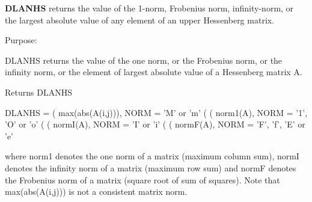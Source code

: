 {\bfseries D\+L\+A\+N\+H\+S} returns the value of the 1-\/norm, Frobenius norm, infinity-\/norm, or the largest absolute value of any element of an upper Hessenberg matrix. 

 \begin{DoxyParagraph}{Purpose\+: }
\begin{DoxyVerb} DLANHS  returns the value of the one norm,  or the Frobenius norm, or
 the  infinity norm,  or the  element of  largest absolute value  of a
 Hessenberg matrix A.\end{DoxyVerb}

\end{DoxyParagraph}
\begin{DoxyReturn}{Returns}
D\+L\+A\+N\+H\+S \begin{DoxyVerb}    DLANHS = ( max(abs(A(i,j))), NORM = 'M' or 'm'
             (
             ( norm1(A),         NORM = '1', 'O' or 'o'
             (
             ( normI(A),         NORM = 'I' or 'i'
             (
             ( normF(A),         NORM = 'F', 'f', 'E' or 'e'

 where  norm1  denotes the  one norm of a matrix (maximum column sum),
 normI  denotes the  infinity norm  of a matrix  (maximum row sum) and
 normF  denotes the  Frobenius norm of a matrix (square root of sum of
 squares).  Note that  max(abs(A(i,j)))  is not a consistent matrix norm.\end{DoxyVerb}
 
\end{DoxyReturn}

